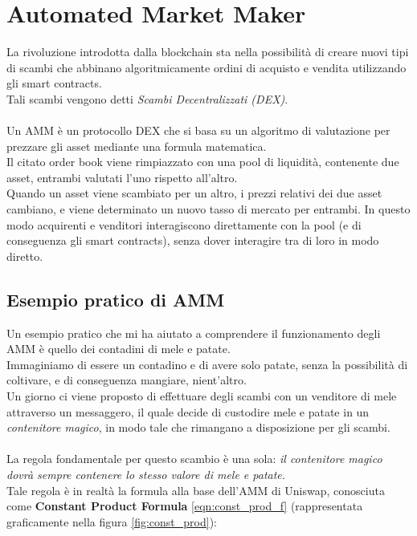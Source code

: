\documentclass[12pt,a4paper]{report}
\begin{document}
\section{Automated Market Maker}

La rivoluzione introdotta dalla blockchain sta nella possibilità di creare nuovi tipi di scambi che abbinano algoritmicamente ordini di acquisto e vendita utilizzando gli smart contracts.
\\Tali scambi vengono detti \textit{Scambi Decentralizzati (DEX)}.
\\\\Un AMM è un protocollo DEX che si basa su un algoritmo di valutazione per prezzare gli asset mediante una formula matematica.
\\Il citato order book viene rimpiazzato con una pool di liquidità\cite{liquidity_pool}, contenente due asset, entrambi valutati l'uno rispetto all'altro.
\\Quando un asset viene scambiato per un altro, i prezzi relativi dei due asset cambiano, e viene determinato un nuovo tasso di mercato per entrambi.
In questo modo acquirenti e venditori interagiscono direttamente con la pool (e di conseguenza gli smart contracts), senza dover interagire tra di loro in modo diretto.

\subsection{Esempio pratico di AMM}

Un esempio pratico che mi ha aiutato a comprendere il funzionamento degli AMM è quello dei contadini di mele e patate.
\\Immaginiamo di essere un contadino e di avere solo patate, senza la possibilità di coltivare, e di conseguenza mangiare, nient'altro.\\ Un giorno ci viene proposto di effettuare degli scambi con un venditore di mele attraverso un messaggero, il quale decide di custodire mele e patate in un \textit{contenitore magico}, in modo tale che rimangano a disposizione per gli scambi.
\\\\La regola fondamentale per questo scambio è una sola: \textit{il contenitore magico dovrà sempre contenere lo stesso valore di mele e patate.}
\\Tale regola è in realtà la formula alla base dell'AMM di Uniswap, conosciuta come \textbf{Constant Product Formula} \ref{eqn:const_prod_f} (rappresentata graficamente nella figura \ref{fig:const_prod}): \\
\end{document}
